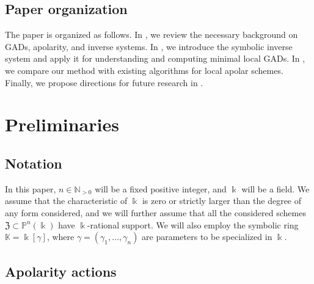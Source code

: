 \documentclass{amsart}
\theoremstyle{plain}
\renewcommand{\k}{\Bbbk}
\newcommand{\K}{\mathbb{K}}
\newcommand{\N}{\mathbb{N}}
\renewcommand{\P}{\mathbb{P}}
\def\c{\gamma}
\def\P{{\mathbb{P}}}
\def\Z{\mathfrak{Z}}
\numberwithin{equation}{section}
\begin{document}
\subsection*{Paper organization}
The paper is organized as follows.
In , we review the necessary background on GADs, apolarity, and inverse systems.
In , we introduce the symbolic inverse system and apply it for understanding and computing minimal local GADs.
In , we compare our method with existing algorithms for local apolar schemes.
Finally, we propose directions for future research in .



\section{Preliminaries} \label{sec:Preliminaries}

\subsection{Notation}

In this paper, $n \in \N_{>0}$ will be a fixed positive integer, and $\k$ will be a field.
We assume that the characteristic of $\k$ is zero or strictly larger than the degree of any form considered, and we will further assume that all the considered schemes $\Z \subset \P^n(\k)$ have $\k$-rational support.
We will also employ the symbolic ring $\K = \k[\c]$, where $\c = (\c_1, \dots, \c_n)$ are parameters to be specialized in $\k$.

\subsection{Apolarity actions}
\end{document}
